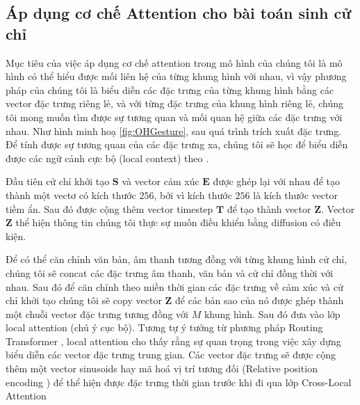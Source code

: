 \subsection{Áp dụng cơ chế Attention cho bài toán sinh cử chỉ}

%



Mục tiêu của việc áp dụng cơ chế attention trong mô hình của chúng tôi là mô hình có thể hiểu được mối liên hệ của từng khung hình với nhau, vì vậy phương pháp của chúng tôi là biểu diễn các đặc trưng của từng khung hình bằng các vector đặc trưng riêng lẻ, và với từng đặc trưng của khung hình riêng lẻ, chúng tôi mong muốn tìm được sự tương quan và mối quan hệ giữa các đặc trưng với nhau.
Như hình minh hoạ \ref{fig:OHGesture}, sau quá trình trích xuất đặc trưng. Để tính được sự tương quan của các đặc trưng xa, chúng tôi sẽ học để biểu diễn được các ngữ cảnh cực bộ (local context) theo \cite{rae2020transformers}.


Đầu tiên cử chỉ khởi tạo $\mathbf{S}$ và vector cảm xúc $\mathbf{E}$ được ghép lại với nhau để tạo thành một vectơ có kích thước $256$, bởi vì kích thước $256$ là kích thước vector tiềm ẩn. Sau đó được cộng thêm vector timestep $\mathbf{T}$ để tạo thành vector $\mathbf{Z}$. Vector $\mathbf{Z}$ thể hiện thông tin chúng tôi thực sự muốn điều khiển bằng diffusion có điều kiện.

Để có thể căn chỉnh văn bản, âm thanh tương đồng với từng khung hình cử chỉ, chúng tôi sẽ concat các đặc trưng âm thanh, văn bản và cử chỉ đồng thời với nhau. Sau đó để căn chỉnh theo miền thời gian các đặc trưng về cảm xúc và cử chỉ khởi tạo chúng tôi sẽ copy vector $\mathbf{Z}$ để các bản sao của nó được ghép thành một chuỗi vector đặc trưng tương đồng với $M$ khung hình. Sau đó đưa vào lớp local attention (chú ý cục bộ). Tương tự ý tưởng từ phương pháp Routing Transformer \cite{roy2021efficient}, local attention cho thấy rằng sự quan trọng trong việc xây dựng biểu diễn các vector đặc trưng trung gian. Các vector đặc trưng sẽ được cộng thêm một vector sinusoids hay mã hoá vị trí tương đối (Relative position encoding \cite{vaswani2017attention}) để thể hiện được đặc trưng thời gian trước khi đi qua lớp Cross-Local Attention

